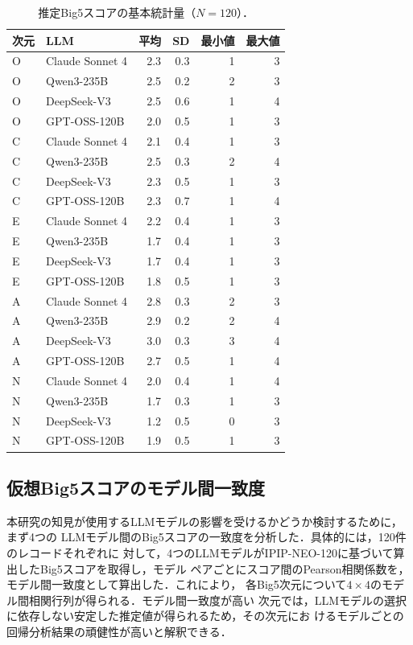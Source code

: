 \documentclass[dvipdfmx,11pt,a4paper]{bxjsarticle}
\renewcommand{\_}{\paperorigunderscore\allowbreak}%
\begin{document}
\begin{table}[htbp]
\centering
\caption{推定Big5スコアの基本統計量（$N = 120$）．}
\label{tab:score_stats}
\begin{tabular}{llrrrr}
\toprule
次元 & LLM & 平均 & SD & 最小値 & 最大値 \\
\midrule
O & Claude Sonnet 4       & 2.3 & 0.3 & 1 & 3 \\
O & Qwen3-235B    & 2.5 & 0.2 & 2 & 3 \\
O & DeepSeek-V3   & 2.5 & 0.6 & 1 & 4 \\
O & GPT-OSS-120B  & 2.0 & 0.5 & 1 & 3 \\
\midrule
C & Claude Sonnet 4       & 2.1 & 0.4 & 1 & 3 \\
C & Qwen3-235B    & 2.5 & 0.3 & 2 & 4 \\
C & DeepSeek-V3   & 2.3 & 0.5 & 1 & 3 \\
C & GPT-OSS-120B  & 2.3 & 0.7 & 1 & 4 \\
\midrule
E & Claude Sonnet 4       & 2.2 & 0.4 & 1 & 3 \\
E & Qwen3-235B    & 1.7 & 0.4 & 1 & 3 \\
E & DeepSeek-V3   & 1.7 & 0.4 & 1 & 3 \\
E & GPT-OSS-120B  & 1.8 & 0.5 & 1 & 3 \\
\midrule
A & Claude Sonnet 4       & 2.8 & 0.3 & 2 & 3 \\
A & Qwen3-235B    & 2.9 & 0.2 & 2 & 4 \\
A & DeepSeek-V3   & 3.0 & 0.3 & 3 & 4 \\
A & GPT-OSS-120B  & 2.7 & 0.5 & 1 & 4 \\
\midrule
N & Claude Sonnet 4       & 2.0 & 0.4 & 1 & 4 \\
N & Qwen3-235B    & 1.7 & 0.3 & 1 & 3 \\
N & DeepSeek-V3   & 1.2 & 0.5 & 0 & 3 \\
N & GPT-OSS-120B  & 1.9 & 0.5 & 1 & 3 \\
\bottomrule
\end{tabular}
\end{table}


\subsection{仮想Big5スコアのモデル間一致度}
\label{sec:appendix_teacher_agreement}

本研究の知見が使用するLLMモデルの影響を受けるかどうか検討するために，まず4つの
LLMモデル間のBig5スコアの一致度を分析した．具体的には，120件のレコードそれぞれに
対して，4つのLLMモデルがIPIP-NEO-120に基づいて算出したBig5スコアを取得し，モデル
ペアごとにスコア間のPearson相関係数を，モデル間一致度として算出した．これにより，
各Big5次元について$4 \times 4$のモデル間相関行列が得られる．モデル間一致度が高い
次元では，LLMモデルの選択に依存しない安定した推定値が得られるため，その次元にお
けるモデルごとの回帰分析結果の頑健性が高いと解釈できる．
\end{document}
